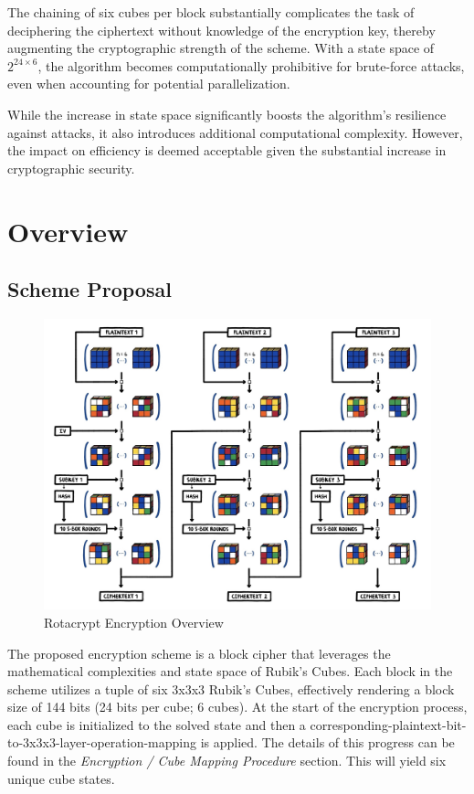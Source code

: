 \documentclass[12pt]{article}
\begin{document}
The chaining of six cubes per block substantially complicates the task of deciphering the ciphertext without knowledge of the encryption key, thereby augmenting the cryptographic strength of the scheme. With a state space of \(2^{24 \times 6}\), the algorithm becomes computationally prohibitive for brute-force attacks, even when accounting for potential parallelization.

While the increase in state space significantly boosts the algorithm's resilience against attacks, it also introduces additional computational complexity. However, the impact on efficiency is deemed acceptable given the substantial increase in cryptographic security.

\section{Overview}

\subsection{Scheme Proposal}

\begin{figure}[H]
    \centering
    \includegraphics[width=\textwidth]{encryption/encryption.jpg}
    \caption{Rotacrypt Encryption Overview}
\end{figure}

The proposed encryption scheme is a block cipher that leverages the mathematical complexities and state space of Rubik's Cubes. Each block in the scheme utilizes a tuple of six 3x3x3 Rubik's Cubes, effectively rendering a block size of 144 bits (24 bits per cube; 6 cubes). At the start of the encryption process, each cube is initialized to the solved state and then a corresponding-plaintext-bit-to-3x3x3-layer-operation-mapping is applied. The details of this progress can be found in the \textit{Encryption / Cube Mapping Procedure} section. This will yield six unique cube states.
\end{document}

